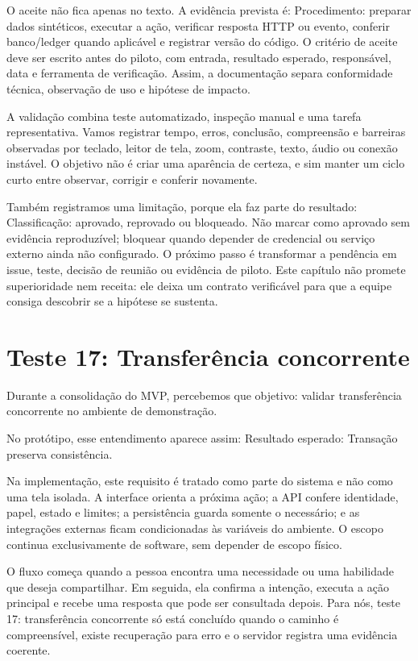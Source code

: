 \documentclass[12pt,oneside,a4paper,article]{abntex2}
\begin{document}
O aceite não fica apenas no texto. A evidência prevista é: Procedimento: preparar dados sintéticos, executar a ação, verificar resposta HTTP ou evento, conferir banco/ledger quando aplicável e registrar versão do código. O critério de aceite deve ser escrito antes do piloto, com entrada, resultado esperado, responsável, data e ferramenta de verificação. Assim, a documentação separa conformidade técnica, observação de uso e hipótese de impacto.

A validação combina teste automatizado, inspeção manual e uma tarefa representativa. Vamos registrar tempo, erros, conclusão, compreensão e barreiras observadas por teclado, leitor de tela, zoom, contraste, texto, áudio ou conexão instável. O objetivo não é criar uma aparência de certeza, e sim manter um ciclo curto entre observar, corrigir e conferir novamente.

Também registramos uma limitação, porque ela faz parte do resultado: Classificação: aprovado, reprovado ou bloqueado. Não marcar como aprovado sem evidência reproduzível; bloquear quando depender de credencial ou serviço externo ainda não configurado. O próximo passo é transformar a pendência em issue, teste, decisão de reunião ou evidência de piloto. Este capítulo não promete superioridade nem receita: ele deixa um contrato verificável para que a equipe consiga descobrir se a hipótese se sustenta.

\section{Teste 17: Transferência concorrente}
Durante a consolidação do MVP, percebemos que objetivo: validar transferência concorrente no ambiente de demonstração.

No protótipo, esse entendimento aparece assim: Resultado esperado: Transação preserva consistência.

Na implementação, este requisito é tratado como parte do sistema e não como uma tela isolada. A interface orienta a próxima ação; a API confere identidade, papel, estado e limites; a persistência guarda somente o necessário; e as integrações externas ficam condicionadas às variáveis do ambiente. O escopo continua exclusivamente de software, sem depender de escopo físico.

O fluxo começa quando a pessoa encontra uma necessidade ou uma habilidade que deseja compartilhar. Em seguida, ela confirma a intenção, executa a ação principal e recebe uma resposta que pode ser consultada depois. Para nós, teste 17: transferência concorrente só está concluído quando o caminho é compreensível, existe recuperação para erro e o servidor registra uma evidência coerente.
\end{document}

